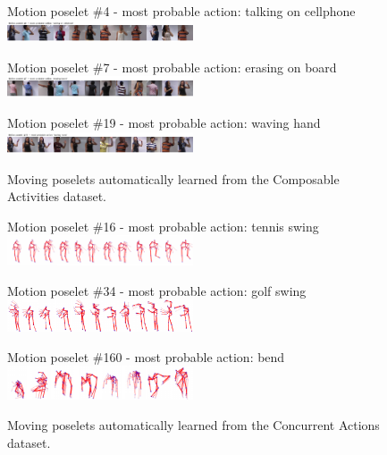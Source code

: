 \begin{figure}[tb]
\begin{center}
\scriptsize
 Motion poselet \#4 - most probable action: talking on cellphone\\
 \includegraphics[trim=0 0 0 0.35cm, clip, width=0.49\textwidth]{Fig/poselets1}

 Motion poselet \#7 - most probable action: erasing on board\\
 \includegraphics[trim=0 0 0 0.35cm, clip, width=0.49\textwidth]{Fig/poselets2}

 Motion poselet \#19 - most probable action: waving hand\\
 \includegraphics[trim=0 0 0 0.35cm, clip, width=0.49\textwidth]{Fig/poselets3}
\end{center}
\vspace{-4mm}
\caption{
\footnotesize
Moving poselets automatically learned from the Composable Activities
dataset.}
\label{fig:poselets_img}
\end{figure}


\begin{figure}[th]
\begin{center}
\scriptsize
 Motion poselet \#16 - most probable action: tennis swing\\
 \includegraphics[trim=0 0 0cm 0cm, clip, width=0.49\textwidth]{Fig/poselets4}

 Motion poselet \#34 - most probable action: golf swing\\
 \includegraphics[trim=0 0 0cm 0cm,clip, width=0.49\textwidth]{Fig/poselets5}

 Motion poselet \#160 - most probable action: bend\\
 \includegraphics[trim=0 0 0cm 0cm, clip, width=0.49\textwidth]{Fig/poselets6}

\end{center}
\vspace{-4mm}
\caption{
\footnotesize
Moving poselets automatically learned from the Concurrent Actions
dataset.}
\label{fig:poselets_skel}
\end{figure}

